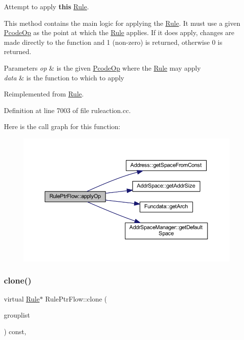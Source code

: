 Attempt to apply {\bfseries{this}} \mbox{\hyperlink{class_rule}{Rule}}. 

This method contains the main logic for applying the \mbox{\hyperlink{class_rule}{Rule}}. It must use a given \mbox{\hyperlink{class_pcode_op}{Pcode\+Op}} as the point at which the \mbox{\hyperlink{class_rule}{Rule}} applies. If it does apply, changes are made directly to the function and 1 (non-\/zero) is returned, otherwise 0 is returned. 
\begin{DoxyParams}{Parameters}
{\em op} & is the given \mbox{\hyperlink{class_pcode_op}{Pcode\+Op}} where the \mbox{\hyperlink{class_rule}{Rule}} may apply \\
\hline
{\em data} & is the function to which to apply \\
\hline
\end{DoxyParams}


Reimplemented from \mbox{\hyperlink{class_rule_a4e3e61f066670175009f60fb9dc60848}{Rule}}.



Definition at line 7003 of file ruleaction.\+cc.

Here is the call graph for this function\+:
\nopagebreak
\begin{figure}[H]
\begin{center}
\leavevmode
\includegraphics[width=350pt]{class_rule_ptr_flow_a4f230dae0158096df0c68cd373abaaf6_cgraph}
\end{center}
\end{figure}
\mbox{\label{class_rule_ptr_flow_a8a960fd15c7bf9c4eefbc185523fd3fc}} 
\subsubsection{\texorpdfstring{clone()}{clone()}}
{\footnotesize\ttfamily virtual \mbox{\hyperlink{class_rule}{Rule}}$\ast$ Rule\+Ptr\+Flow\+::clone (\begin{DoxyParamCaption}\item[{const \mbox{\hyperlink{class_action_group_list}{Action\+Group\+List}} \&}]{grouplist }\end{DoxyParamCaption}) const\hspace{0.3cm}{\ttfamily [inline]}, {\ttfamily [virtual]}}



